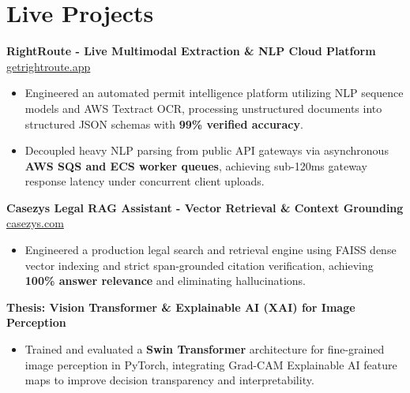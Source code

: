 \documentclass[9.5pt,a4paper]{article}
\begin{document}
\section*{Live Projects}
\noindent
\textbf{RightRoute - Live Multimodal Extraction \& NLP Cloud Platform} \hfill \href{https://getrightroute.app}{getrightroute.app}
\begin{itemize}
    \item Engineered an automated permit intelligence platform utilizing NLP sequence models and AWS Textract OCR, processing unstructured documents into structured JSON schemas with \textbf{99\% verified accuracy}.
    \item Decoupled heavy NLP parsing from public API gateways via asynchronous \textbf{AWS SQS and ECS worker queues}, achieving sub-120ms gateway response latency under concurrent client uploads.
\end{itemize}
\vspace{0.6pt}
\noindent
\textbf{Casezys Legal RAG Assistant - Vector Retrieval \& Context Grounding} \hfill \href{https://casezys.com}{casezys.com}
\begin{itemize}
    \item Engineered a production legal search and retrieval engine using FAISS dense vector indexing and strict span-grounded citation verification, achieving \textbf{100\% answer relevance} and eliminating hallucinations.
\end{itemize}
\vspace{0.6pt}
\noindent
\textbf{Thesis: Vision Transformer \& Explainable AI (XAI) for Image Perception}
\begin{itemize}
    \item Trained and evaluated a \textbf{Swin Transformer} architecture for fine-grained image perception in PyTorch, integrating Grad-CAM Explainable AI feature maps to improve decision transparency and interpretability.
\end{itemize}
\vspace{0.6pt}
\end{document}
